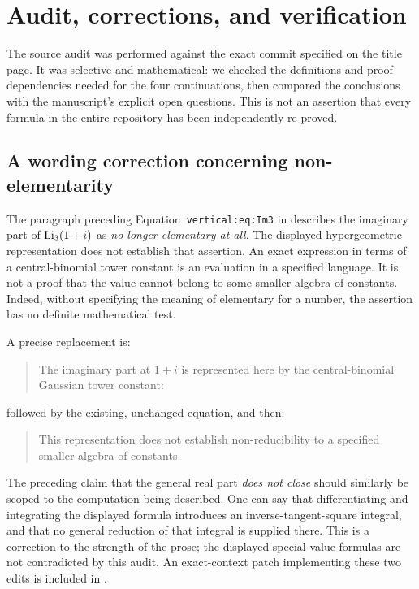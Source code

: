 \section{Audit, corrections, and verification}
\label{sec:audit}

The source audit was performed against the exact commit specified on
the title page. It was selective and mathematical: we checked the
definitions and proof dependencies needed for the four continuations,
then compared the conclusions with the manuscript's explicit open
questions. This is not an assertion that every formula in the entire
repository has been independently re-proved.

\subsection{A wording correction concerning non-elementarity}

The paragraph preceding Equation~\texttt{vertical:eq:Im3} in
 describes the imaginary part of
$\operatorname{Li}_3(1+i)$ as \emph{no longer elementary at all}. The displayed
hypergeometric representation does not establish that assertion.
An exact expression in terms of a central-binomial tower constant
is an evaluation in a specified language. It is not a proof that
the value cannot belong to some smaller algebra of constants.
Indeed, without specifying the meaning of elementary for a
number, the assertion has no definite mathematical test.

\begin{samepage}
A precise replacement is:
\begin{quote}
The imaginary part at $1+i$ is represented here by the
central-binomial Gaussian tower constant:
\end{quote}
\end{samepage}
followed by the existing, unchanged equation, and then:
\begin{quote}
This representation does not establish non-reducibility to a
specified smaller algebra of constants.
\end{quote}
The preceding claim that the general real part \emph{does not close}
should similarly be scoped to the computation being described.
One can say that differentiating and integrating the displayed
formula introduces an inverse-tangent-square integral, and that
no general reduction of that integral is supplied there.
This is a correction to the strength of the prose; the displayed
special-value formulas are not contradicted by this audit.
An exact-context patch implementing these two edits is included
in .

